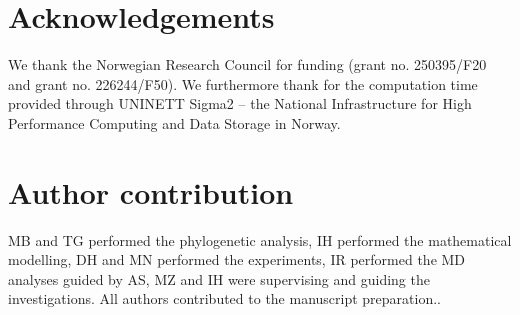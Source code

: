 
\section*{Acknowledgements}

We thank the Norwegian Research Council for funding (grant no. 250395/F20 and grant no. 226244/F50). We furthermore thank for the computation time provided through UNINETT Sigma2 – the National Infrastructure for High Performance Computing and Data Storage in Norway.

\section*{Author contribution}
MB and TG performed the phylogenetic analysis, IH performed the mathematical modelling, DH and MN performed the experiments, IR performed the MD analyses guided by AS, MZ and IH were supervising and guiding the investigations.
All authors contributed to the manuscript preparation..